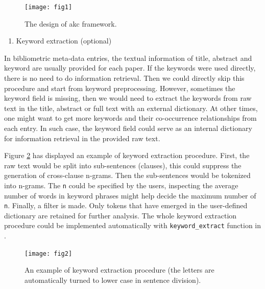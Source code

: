 \begin{Schunk}
\begin{figure}
\texttt{[image: fig1]} \caption[The design of akc framework]{The design of akc framework.}\label{fig:fig1}
\end{figure}
\end{Schunk}

\begin{enumerate}
\def\labelenumi{(\arabic{enumi})}
\tightlist
\item
  Keyword extraction (optional)
\end{enumerate}

In bibliometric meta-data entries, the textual information of title,
abstract and keyword are usually provided for each paper. If the
keywords were used directly, there is no need to do information
retrieval. Then we could directly skip this procedure and start from
keyword preprocessing. However, sometimes the keyword field is missing,
then we would need to extract the keywords from raw text in the title,
abstract or full text with an external dictionary. At other times, one
might want to get more keywords and their co-occurrence relationships
from each entry. In such case, the keyword field could serve as an
internal dictionary for information retrieval in the provided raw text.

Figure \ref{fig:fig2} has displayed an example of keyword extraction
procedure. First, the raw text would be split into sub-sentences
(clauses), this could suppress the generation of cross-clause n-grams.
Then the sub-sentences would be tokenized into n-grams. The \texttt{n}
could be specified by the users, inspecting the average number of words
in keyword phrases might help decide the maximum number of \texttt{n}.
Finally, a filter is made. Only tokens that have emerged in the
user-defined dictionary are retained for further analysis. The whole
keyword extraction procedure could be implemented automatically with
\texttt{keyword\_extract} function in .

\begin{Schunk}
\begin{figure}
\texttt{[image: fig2]} \caption[An example of keyword extraction procedure (the letters are automatically turned to lower case in sentence division)]{An example of keyword extraction procedure (the letters are automatically turned to lower case in sentence division).}\label{fig:fig2}
\end{figure}
\end{Schunk}

